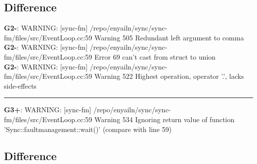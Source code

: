 \documentclass[12pt,twoside]{article}
\begin{document}
\subsection{Difference} 
\textbf{G2-}: WARNING: [sync-fm] /repo/enyailn/sync/sync-fm/files/src/EventLoop.cc:59 Warning 505 Redundant left argument to comma\\ 
\textbf{G2-}: WARNING: [sync-fm] /repo/enyailn/sync/sync-fm/files/src/EventLoop.cc:59 Error 69 can't cast from struct to union\\ 
\textbf{G2-}: WARNING: [sync-fm] /repo/enyailn/sync/sync-fm/files/src/EventLoop.cc:59 Warning 522 Highest operation, operator '.', lacks side-effects\\ 
\rule{\textwidth}{0.5pt} 
\textbf{G3+}: WARNING: [sync-fm] /repo/enyailn/sync/sync-fm/files/src/EventLoop.cc:59 Warning 534 Ignoring return value of function 'Sync::faultmanagement::wait()' (compare with line 59)\\ 
\subsection{Difference} 
  
\end{document}
